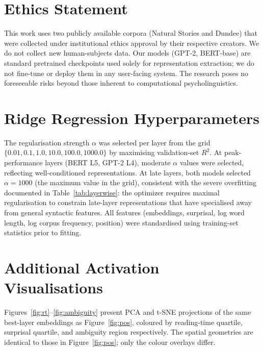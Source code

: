 \documentclass[11pt]{article}
\begin{document}
\section*{Ethics Statement}

This work uses two publicly available corpora (Natural Stories and Dundee) that were collected under institutional ethics approval by their respective creators.
We do not collect new human-subjects data.
Our models (GPT-2, BERT-base) are standard pretrained checkpoints used solely for representation extraction; we do not fine-tune or deploy them in any user-facing system.
The research poses no foreseeable risks beyond those inherent to computational psycholinguistics.




\appendix
\section{Ridge Regression Hyperparameters}
\label{app:hyperparams}

The regularisation strength $\alpha$ was selected per layer from the grid $\{0.01, 0.1, 1.0, 10.0, 100.0, 1000.0\}$ by maximising validation-set $R^2$.
At peak-performance layers (BERT L5, GPT-2 L4), moderate $\alpha$ values were selected, reflecting well-conditioned representations.
At late layers, both models selected $\alpha = 1000$ (the maximum value in the grid), consistent with the severe overfitting documented in Table~\ref{tab:layerwise}: the optimizer requires maximal regularisation to constrain late-layer representations that have specialised away from general syntactic features.
All features (embeddings, surprisal, log word length, log corpus frequency, position) were standardised using training-set statistics prior to fitting.

\section{Additional Activation Visualisations}
\label{app:viz}

Figures~\ref{fig:rt}--\ref{fig:ambiguity} present PCA and t-SNE projections of the same best-layer embeddings as Figure~\ref{fig:pos}, coloured by reading-time quartile, surprisal quartile, and ambiguity region respectively.
The spatial geometries are identical to those in Figure~\ref{fig:pos}; only the colour overlays differ.
\end{document}
